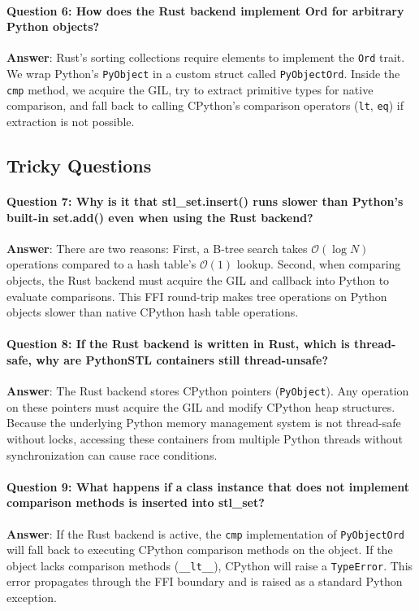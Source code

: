 \documentclass[11pt,a4paper]{article}
\begin{document}
\paragraph{Question 6: How does the Rust backend implement Ord for arbitrary Python objects?}
\textbf{Answer}: Rust's sorting collections require elements to implement the \texttt{Ord} trait. We wrap Python's \texttt{PyObject} in a custom struct called \texttt{PyObjectOrd}. Inside the \texttt{cmp} method, we acquire the GIL, try to extract primitive types for native comparison, and fall back to calling CPython's comparison operators (\texttt{lt}, \texttt{eq}) if extraction is not possible.

\subsection{Tricky Questions}

\paragraph{Question 7: Why is it that stl\_set.insert() runs slower than Python's built-in set.add() even when using the Rust backend?}
\textbf{Answer}: There are two reasons:
First, a B-tree search takes $\mathcal{O}(\log N)$ operations compared to a hash table's $\mathcal{O}(1)$ lookup.
Second, when comparing objects, the Rust backend must acquire the GIL and callback into Python to evaluate comparisons. This FFI round-trip makes tree operations on Python objects slower than native CPython hash table operations.

\paragraph{Question 8: If the Rust backend is written in Rust, which is thread-safe, why are PythonSTL containers still thread-unsafe?}
\textbf{Answer}: The Rust backend stores CPython pointers (\texttt{PyObject}). Any operation on these pointers must acquire the GIL and modify CPython heap structures. Because the underlying Python memory management system is not thread-safe without locks, accessing these containers from multiple Python threads without synchronization can cause race conditions.

\paragraph{Question 9: What happens if a class instance that does not implement comparison methods is inserted into stl\_set?}
\textbf{Answer}: If the Rust backend is active, the \texttt{cmp} implementation of \texttt{PyObjectOrd} will fall back to executing CPython comparison methods on the object. If the object lacks comparison methods (\texttt{\_\_lt\_\_}), CPython will raise a \texttt{TypeError}. This error propagates through the FFI boundary and is raised as a standard Python exception.
\end{document}
